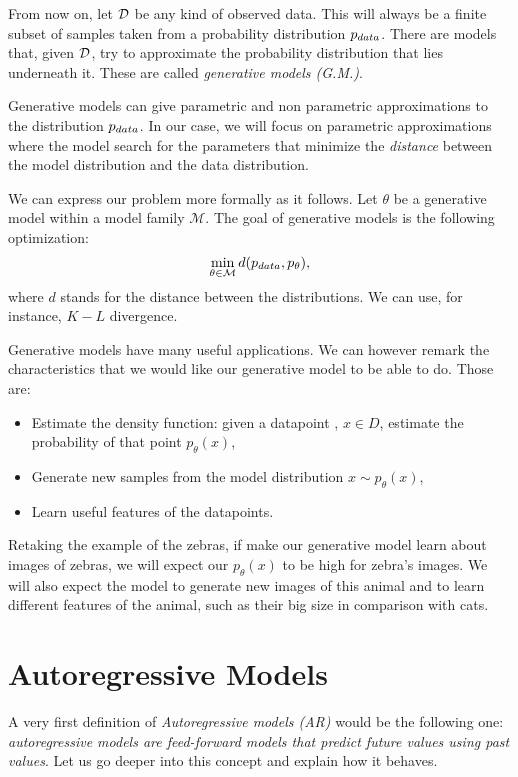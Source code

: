 From now on, let $\mathcal{D}$ be any kind of observed data. This will always be a finite subset of samples taken from a probability distribution $p_{data}$. There are models that, given $\mathcal{D}$, try to approximate the 
probability distribution that lies underneath it. These are called \emph{generative models (G.M.)}. 

Generative models can give parametric and non parametric approximations to the distribution $p_{data}$. 
In our case, we will focus on parametric approximations where the model search for the parameters that minimize the \emph{distance} between the model distribution and the data distribution. 

We can express our problem more formally as it follows. Let $\theta$ be a generative model within a model family $\mathcal M$. The goal of generative models is the following optimization:
$$
\min_{\theta \in \mathcal M} d(p_{data},p_\theta),
$$
where $d$ stands for the distance between the distributions. We can use, for instance, $K-L$ divergence.

Generative models have many useful applications. We can however remark the characteristics that we would like our generative model to be able to do. Those are:
\begin{itemize}
\item Estimate the density function: given a datapoint , $x \in D$, estimate the probability of that point $p_\theta(x)$,
\item Generate new samples from the model distribution $x \sim p_\theta(x)$,
\item Learn useful features of the datapoints.
\end{itemize}

Retaking the example of the zebras, if make our generative model learn about images of zebras, we will expect our $p_\theta(x)$ to be high for zebra's images. We will also expect the model
to generate new images of this animal and to learn different features of the animal, such as their big size in comparison with cats.

\section{Autoregressive Models}

A very first definition of \emph{Autoregressive models (AR)} would be the following one: \emph{autoregressive models are feed-forward models that predict future values using past values}. Let us go deeper into this 
concept and explain how it behaves.

